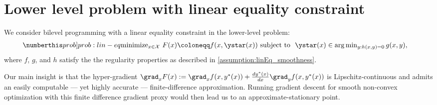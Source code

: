 \section{Lower level problem with linear equality constraint}\label{sec:equality-bilevel}
We consider bilevel programming with a linear equality constraint in the lower-level problem: 
\begin{align*}\numberthis\label[prob]{prob:lin-eq}
     & \mbox{minimize}_{x\in \mathcal{X}} ~ F(x) \coloneqq f(x, \ystar(x)) \text{ subject to } ~\ystar(x)\in \arg\min\nolimits_{y: h(x, y) = 0} g(x, y), 
\end{align*}
where $f$, $g$, and $h$ satisfy the 
the regularity properties as described in  \cref{assumption:linEq_smoothness}. 


Our main insight is that the hyper-gradient  $\grad_{x}F(x):=\grad_{x}f(x,y^{*}(x))+\frac{d y^*(x)}{dx}\grad_{y}f(x,y^{*}(x))$ is Lipschitz-continuous and  admits an easily computable --- yet highly accurate --- finite-difference approximation. Running gradient descent  for smooth non-convex optimization with this finite difference gradient proxy would then lead us to an approximate-stationary point. 

